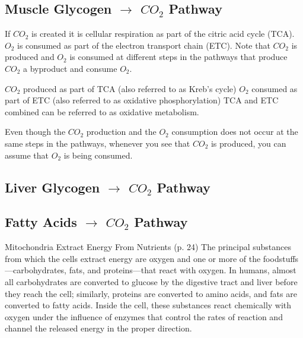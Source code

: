 
\subsection{Muscle Glycogen $\rightarrow$ $CO_2$ Pathway}

If $CO_2$ is created it is cellular respiration as part of the citric acid cycle (TCA). $O_2$ is consumed as part of the electron transport chain (ETC). Note that $CO_2$ is produced and $O_2$ is consumed at different steps in the pathways that produce $CO_2$ a byproduct and consume $O_2$.

$CO_2$ produced as part of TCA (also referred to as Kreb's cycle)
$O_2$ consumed as part of ETC (also referred to as oxidative phosphorylation)
TCA and ETC combined can be referred to as oxidative metabolism. 

Even though the $CO_2$ production and the $O_2$ consumption does not occur at the same steps in the pathways, whenever you see that $CO_2$ is produced, you can assume that $O_2$ is being consumed. 

\subsection{Liver Glycogen $\rightarrow$ $CO_2$ Pathway}

\subsection{Fatty Acids $\rightarrow$ $CO_2$ Pathway}



Mitochondria Extract Energy From Nutrients (p. 24) The principal substances from which the cells extract energy are oxygen and one or more of the foodstuffs—carbohydrates, fats, and proteins—that react with oxygen. In humans, almost all carbohydrates are converted to glucose by the digestive tract and liver before they reach the cell; similarly, proteins are converted to amino acids, and fats are converted to fatty acids. Inside the cell, these substances react chemically with oxygen under the influence of enzymes that control the rates of reaction and channel the released energy in the proper direction.

